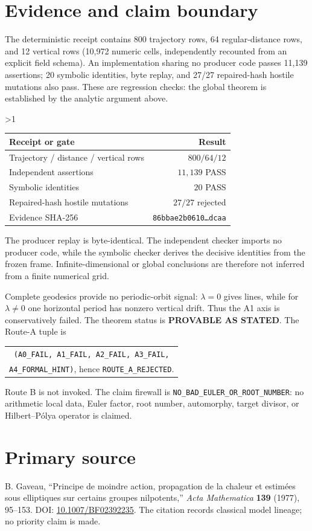 \documentclass[10pt]{article}
\providecommand{\CRevisionRound}{2}
\begin{document}
\section{Evidence and claim boundary}
The deterministic receipt contains 800 trajectory rows, 64 regular-distance
rows, and 12 vertical rows (10,972 numeric cells, independently recounted from
an explicit field schema).  An implementation sharing no producer code passes
11,139 assertions; 20 symbolic identities, byte replay, and 27/27 repaired-hash
hostile mutations also pass.  These are regression
checks: the global theorem is established by the analytic argument above.

\ifnum\CRevisionRound>1
\begin{center}
\small
\begin{tabular}{@{}lr@{}}
\toprule
Receipt or gate & Result\\
\midrule
Trajectory / distance / vertical rows & $800/64/12$\\
Independent assertions & $11{,}139$ PASS\\
Symbolic identities & $20$ PASS\\
Repaired-hash hostile mutations & $27/27$ rejected\\
Evidence SHA-256 & \texttt{86bbae2b0610\ldots dcaa}\\
\bottomrule
\end{tabular}
\end{center}
The producer replay is byte-identical.  The independent checker imports no
producer code, while the symbolic checker derives the decisive identities from
the frozen frame.  Infinite-dimensional or global conclusions are therefore
not inferred from a finite numerical grid.
\fi

Complete geodesics provide no periodic-orbit signal: $\lambda=0$ gives lines,
while for $\lambda\ne0$ one horizontal period has nonzero vertical drift.
Thus the A1 axis is conservatively failed.  The theorem status is
\textbf{PROVABLE AS STATED}.  The Route-A tuple is
\begin{center}\small
\begin{tabular}{@{}c@{}}
\texttt{(A0\_FAIL, A1\_FAIL, A2\_FAIL, A3\_FAIL,}\\
\texttt{A4\_FORMAL\_HINT)}, hence \texttt{ROUTE\_A\_REJECTED}.
\end{tabular}
\end{center}
Route B is not invoked.  The claim firewall is
\texttt{NO\_BAD\_EULER\_OR\_ROOT\_NUMBER}: no arithmetic local data, Euler
factor, root number, automorphy, target divisor, or Hilbert--P\'olya operator is
claimed.

\section*{Primary source}
B. Gaveau, ``Principe de moindre action, propagation de la chaleur et estim\'ees
sous elliptiques sur certains groupes nilpotents,'' \emph{Acta Mathematica}
\textbf{139} (1977), 95--153. DOI:
\href{https://doi.org/10.1007/BF02392235}{10.1007/BF02392235}.
The citation records classical model lineage; no priority claim is made.
\end{document}
